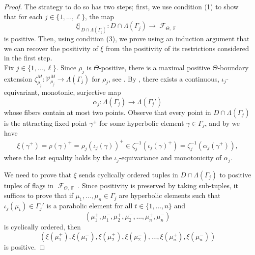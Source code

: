 \documentclass{amsart}
\theoremstyle{plain}
\theoremstyle{definition}
\DeclareMathOperator{\Fc}{\mathcal{F}}
\DeclareMathOperator{\Fb}{{\mathbb{F}}}
\newcommand{\1}{\mathbf{1}}
\begin{document}
\begin{proof}
    The strategy to do so has two steps; first, we use condition (1) to show that for each $j\in\{1,\dots,\ell\}$, the map \[\xi|_{D\cap\Lambda(\Gamma_j)}:D\cap\Lambda(\Gamma_j)\to\Fc_{\Theta,\Fb}\] 
    is positive. Then, using condition (3), we prove using an induction argument that we can recover the positivity of $\xi$ from the positivity of its restrictions considered in the first step.\\

     Fix $j\in\{1,\dots,\ell\}$. Since $\rho_j$ is $\Theta$-positive, there is a maximal positive $\Theta$-boundary extension $\zeta_{\rho_j}^M\colon\mathcal V_{\rho_j}^M\to\Lambda(\Gamma_j)$ for $\rho_j$, see . By , there exists a continuous, $\iota_j$-equivariant, monotonic, surjective map 
    \[\alpha_j\colon \Lambda(\Gamma_j)\to  \Lambda(\Gamma_j')\]
    whose fibers contain at most two points.
    Observe that every point in $D\cap\Lambda(\Gamma_j)$ is the attracting fixed point $\gamma^+$ for some hyperbolic element $\gamma\in\Gamma_j$, and by  we have
    \begin{align}
    \label{eqn: blah}
        \xi(\gamma^+)=\rho(\gamma)^+=\rho_j(\iota_j(\gamma))^+\in\zeta_j^{-1}(\iota_j(\gamma)^+)=\zeta_j^{-1}(\alpha_j(\gamma^+)),
    \end{align}
    where the last equality holds by the $\iota_j$-equivariance and monotonicity of $\alpha_j$.  

We need to prove that $\xi$ sends cyclically ordered tuples in $D\cap\Lambda(\Gamma_j)$ to positive tuples of flags in $\Fc_{\Theta,\Fb}$. Since positivity is preserved by taking sub-tuples, it suffices to prove that if $\mu_1,\dots,\mu_n\in\Gamma_j$ are hyperbolic elements such that $\iota_j(\mu_t)\in\Gamma_j'$ is a parabolic element for all $t\in\{1,\dots,n\}$ and
\[(\mu_1^+,\mu_1^-,\mu_2^+,\mu_2^-,\dots,\mu_n^+,\mu_n^-)\]
is cyclically ordered, then 
\[\left(\xi(\mu_1^+),\xi(\mu_1^-),\xi(\mu_2^+),\xi(\mu_2^-),\dots,\xi(\mu_n^+),\xi(\mu_n^-)\right)\] 
is positive. 
    

\end{proof}
\end{document}
